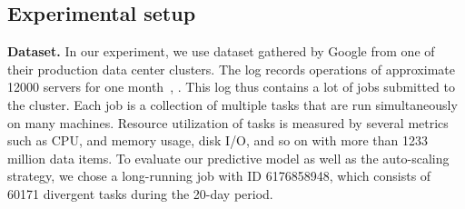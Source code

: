 \documentclass[runningheads]{llncs}
\begin{document}
\subsection{Experimental setup}
\label{experimental_setup}

\textbf{Dataset.} In our experiment, we use dataset gathered by Google from one of their production data center clusters. The log records operations of approximate 12000 servers for one month~\cite{clusterdata:Reiss2011}, \cite{ref_google_trace}. This log thus contains a lot of jobs submitted to the cluster. Each job is a collection of multiple tasks that are run simultaneously on many machines. Resource utilization of tasks is measured by several metrics such as CPU, and memory usage, disk I/O, and so on with more than 1233 million data items. To evaluate our predictive model as well as the auto-scaling strategy, we chose a long-running job with ID 6176858948, which consists of 60171 divergent tasks during the 20-day period. 
\end{document}
